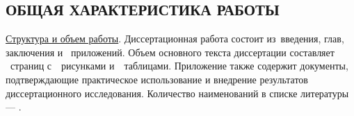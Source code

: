 
%
%
%
%


\setcounter{page}{3}

\subsection*{\MakeUppercase{Общая характеристика работы}}



\underline{Структура и объем работы}. Диссертационная работа состоит
из~введения,  глав, заключения и~ приложений. Объем
основного текста диссертации составляет ~страниц
с~~рисунками и~~таблицами. Приложение также содержит
документы, подтверждающие практическое использование и внедрение
результатов диссертационного исследования. Количество наименований в
списке литературы --- .

